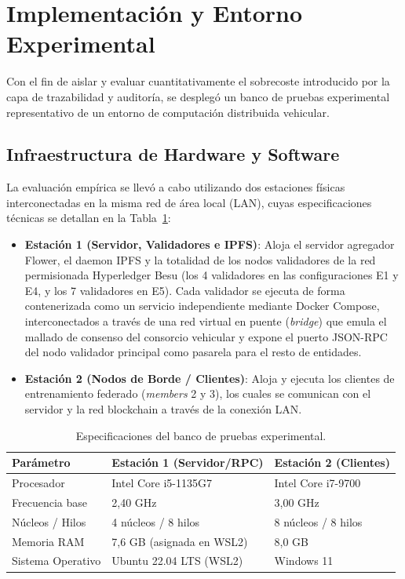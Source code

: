 \section{Implementación y Entorno Experimental}
\label{sec:implementacion}

Con el fin de aislar y evaluar cuantitativamente el sobrecoste introducido por la capa de trazabilidad y auditoría, se desplegó un banco de pruebas experimental representativo de un entorno de computación distribuida vehicular.

\subsection{Infraestructura de Hardware y Software}
La evaluación empírica se llevó a cabo utilizando dos estaciones físicas interconectadas en la misma red de área local (LAN), cuyas especificaciones técnicas se detallan en la Tabla~\ref{tab:testbed_hardware}:
\begin{itemize}
    \item \textbf{Estación 1 (Servidor, Validadores e IPFS)}: Aloja el servidor agregador Flower, el daemon IPFS y la totalidad de los nodos validadores de la red permisionada Hyperledger Besu (los 4 validadores en las configuraciones E1 y E4, y los 7 validadores en E5). Cada validador se ejecuta de forma contenerizada como un servicio independiente mediante Docker Compose, interconectados a través de una red virtual en puente (\textit{bridge}) que emula el mallado de consenso del consorcio vehicular y expone el puerto JSON-RPC del nodo validador principal como pasarela para el resto de entidades.
    \item \textbf{Estación 2 (Nodos de Borde / Clientes)}: Aloja y ejecuta los clientes de entrenamiento federado (\textit{members} 2 y 3), los cuales se comunican con el servidor y la red blockchain a través de la conexión LAN.
\end{itemize}

\begin{table}[htbp]
\caption{Especificaciones del banco de pruebas experimental.}\label{tab:testbed_hardware}
\begin{tabular*}{\textwidth}{@{\extracolsep\fill}lll}
\toprule
\textbf{Parámetro} & \textbf{Estación 1 (Servidor/RPC)} & \textbf{Estación 2 (Clientes)} \\
\midrule
Procesador & Intel Core i5-1135G7 & Intel Core i7-9700 \\
Frecuencia base & 2,40 GHz & 3,00 GHz \\
Núcleos / Hilos & 4 núcleos / 8 hilos & 8 núcleos / 8 hilos \\
Memoria RAM & 7,6 GB (asignada en WSL2) & 8,0 GB \\
Sistema Operativo & Ubuntu 22.04 LTS (WSL2) & Windows 11 \\
\bottomrule
\end{tabular*}
\end{table}

